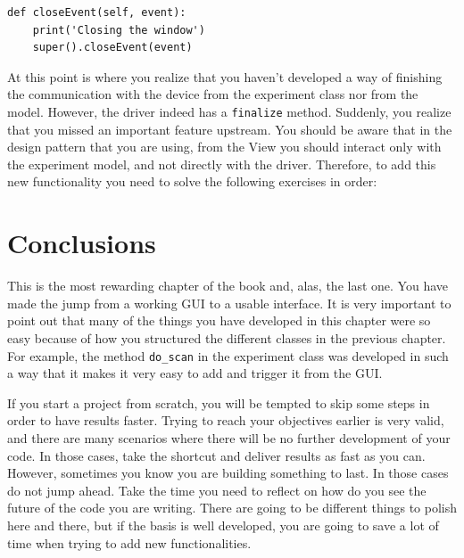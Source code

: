 \begin{verbatim}
def closeEvent(self, event):
    print('Closing the window')
    super().closeEvent(event)
\end{verbatim}

At this point is where you realize that you haven't developed a way of
finishing the communication with the device from the experiment class
nor from the model. However, the driver indeed has a \texttt{finalize}
method. Suddenly, you realize that you missed an important feature
upstream. You should be aware that in the design pattern that you are
using, from the View you should interact only with the experiment model,
and not directly with the driver. Therefore, to add this new
functionality you need to solve the following exercises in order:





\section{Conclusions}\label{conclusions}
This is the most rewarding chapter of the book and, alas, the last one.
You have made the jump from a working {GUI} to a usable interface. It is
very important to point out that many of the things you have developed
in this chapter were so easy because of how you structured the different
classes in the previous chapter. For example, the method
\texttt{do\_scan} in the experiment class was developed in such a way
that it makes it very easy to add and trigger it from the {GUI}.

If you start a project from scratch, you will be tempted to skip some
steps in order to have results faster. Trying to reach your objectives
earlier is very valid, and there are many scenarios where there will be
no further development of your code. In those cases, take the shortcut
and deliver results as fast as you can. However, sometimes you know you
are building something to last. In those cases do not jump ahead. Take
the time you need to reflect on how do you see the future of the code
you are writing. There are going to be different things to polish here
and there, but if the basis is well developed, you are going to save a
lot of time when trying to add new functionalities.

